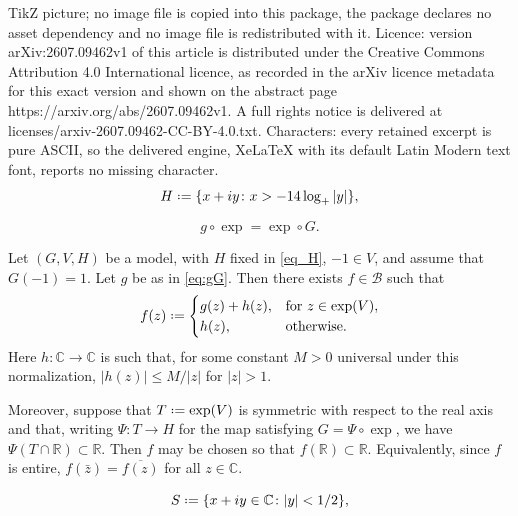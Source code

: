 \documentclass[10pt,a4paper]{amsart}
\newcommand{\C}{{\mathbb{C}}}
\newcommand{\R}{{\mathbb{R}}}
\newcommand*{\defeq}{\mathrel{\vcenter{\baselineskip0.5ex \lineskiplimit0pt
 \hbox{\scriptsize.}\hbox{\scriptsize.}}}=}
\begin{document}
TikZ picture; no image file is copied into this package, the package declares no asset dependency and no image file is redistributed with it. Licence: version arXiv:2607.09462v1 of this article is distributed under the Creative Commons Attribution 4.0 International licence, as recorded in the arXiv licence metadata for this exact version and shown on the abstract page https://arxiv.org/abs/2607.09462v1. A full rights notice is delivered at licenses/arxiv-2607.09462-CC-BY-4.0.txt. Characters: every retained excerpt is pure ASCII, so the delivered engine, XeLaTeX with its default Latin Modern text font, reports no missing character.
\begin{equation}
	\label{eq_H}
	H \defeq \{ x+iy \colon x> -14\log_+\vert y\vert \},
\end{equation}

\begin{equation}
	\label{eq:gG}
	g \circ \exp = \exp \circ G.
\end{equation} 

\begin{theorem}
	\label{thm_approx1.7}
	Let $(G, V, H)$ be a model, with $H$ fixed in \eqref{eq_H}, $-1\in V$, and assume that $G(-1)=1$.
	Let $g$ be as in \eqref{eq:gG}.
	Then there exists $f\in \mathcal{B}$ such that
	\begin{equation}
		\label{eq_f}
		f(z) \defeq 
		\begin{cases}
			g(z)+h(z), &\text{for } z\in \exp(V), \\
			h(z),   &\text{otherwise.}
		\end{cases}
	\end{equation}
	Here $h\colon \C \rightarrow \C$ is such that, for some constant $M>0$ universal under this normalization, $\vert h(z)\vert \leq M/\vert z \vert $ for $|z| > 1$.

Moreover, suppose that \(T\defeq \exp(V)\) is symmetric with respect to the real axis and that, writing \(\Psi\colon T\to H\) for the map satisfying
	\(G=\Psi\circ\exp\), we have \(\Psi(T\cap\R)\subset\R\). Then \(f\) may be
	chosen so that \(f(\R)\subset\R\). Equivalently, since \(f\) is entire,
	\(f(\bar z)=\overline{f(z)}\) for all \(z\in\C\).
\end{theorem}

	\begin{equation}\label{eq_S}
		S \defeq \{ x + iy \in \C \colon |y| < 1/2 \},
	\end{equation}
\end{document}
